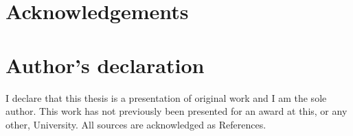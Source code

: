 
\newpage

\setcounter{tocdepth}{3}
\tableofcontents

\newpage

\listoffigures

\newpage

\listoftables

\newpage




\section{Acknowledgements}

\newpage

\section{Author's declaration}

\label{sec:declaration}

I declare that this thesis is a presentation of original work and I am the sole author. This work has not previously been presented for an award at this, or any other, University. All sources are acknowledged as References. 

\newpage



\setcounter{secnumdepth}{4}

\pagestyle{fancy}
\renewcommand{\headrulewidth}{0pt}
\rhead{\slshape\nouppercase{\leftmark}}
\lhead[E,O]{}



